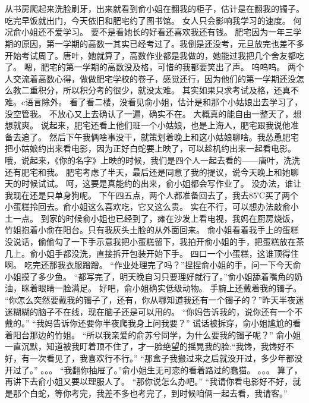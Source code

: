 \chapter{}
从书房爬起来洗脸刷牙，出来就看到俞小姐在翻我的柜子，估计是在翻我的镯子。
吃完早饭就出门，今天依旧和肥宅约了图书馆。
女人只会影响我学习的速度。
何况俞小姐还不爱学习。
要不是看她长的好看还喜欢我还有钱。
肥宅因为一年三学期的原因，第一学期的高数一其实已经考过了。我倒是还没考，元旦放完也差不多开始考试周了。唐叶，她就算了，高数作业都是我做的，她能过我把几个舍友都吃了。
嗯，肥宅的第一学期的高数没及格，可惜的我都要笑出了声。
呜呜呜。
两个人交流着高数心得，做做肥宅学校的卷子，感觉还行，因为他们的第一学期还没怎么教二重积分，所以积分考的很少，就没太难。
其实如果只求考试及格，还真不难。c语言除外。
看了看二楼，没看见俞小姐，估计是和那个小姑娘出去学习了，没空管我。
不放心又上去确认了一遍，确实不在。
大概真的能自由一整天了，想想就爽。
说起来，肥宅还看上他们班一个小姑娘，也是上海人，肥宅跟我说他准备去追了。
然后下午我俩啥事没干，就策划着晚上和这小姑娘聊啥。我怂恿肥宅把小姑娘约出来看电影，因为正好白蛇要上映了，可以趁机约出来一起看电影。
哦，说起来，《你的名字》上映的时候，我们是四个人一起去看的——唐叶，洗洗还有肥宅和我。
肥宅考虑了半天，最后还是同意了我的提议，说今天晚上和她聊天的时候试试。
呵，这要是真能约的出来，俞小姐都会写作业了。
没办法，谁让我现在还是只单身狗呢。
下午四五点，两个人都准备回去了，我去85℃买了两个小蛋糕拎回去。俞小姐这么喜欢吃，它又这么贵。
实在不行，可以想办法敲俞小土一点。
到家的时候俞小姐也已经到了，瘫在沙发上看电视，我妈在厨房烧饭，竹姐抱着小俞在阳台。只有我灰头土脸的从外面回来。
俞小姐看着我手上的蛋糕没说话，偷偷勾了一下手示意我把小蛋糕留下，我拍开俞小姐的手，把蛋糕放在茶几上。俞小姐手都没洗，直接拆开包装开始下手。
四口一个小蛋糕，这谁顶得住啊。
吃完还那我衣服蹭蹭。
“作业处理完了吗？”捏捏俞小姐的手，问一下今天俞小姐摸了多少鱼。
“都写完了，明天晚自习只要理好就行了。”俞小姐舔着嘴角的奶油，眯着眼睛一脸满足。
好吧，俞小姐确实低级动物。
手腕上还戴着我的镯子。
“你怎么突然要戴我的镯子了，还有，你从哪知道我还有一个镯子的？”昨天半夜迷迷糊糊的脑子不在线，现在脑子还是可以用的。
“你妈告诉我的，说你还有一个不戴的。”
“我妈告诉你还要你半夜爬我身上问我要？”
谎话被拆穿，俞小姐尴尬的看着阳台那边的竹姐。
“所以我亲爱的俞苏兮同学，为什么要我的镯子呢？”
俞小姐一直沉默，知道被我盯着顶不住了，才一脸绝望的摇晃我的脸:“我馋，我馋好不好，有一次看见了，我喜欢行不行。”
“那盒子我搬过来之后就没开过，多少年都没开过了。”
。。。
“我翻你抽屉了。”俞小姐生无可恋的看着路过的蠢猫。
。。。
算了，再讲下去俞小姐又要以理服人了。
“那你说怎么办吧。”
“我请你看电影好不好，就是那个白蛇，等你考完，我差不多也考完了，到时候咱俩一起去看，我请客。”
